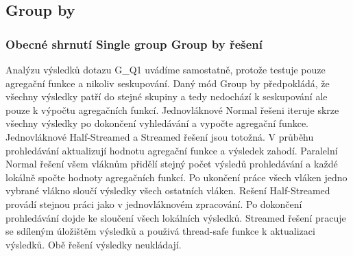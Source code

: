 \subsection{Group by}

\subsubsection{Obecné shrnutí Single group Group by řešení}

Analýzu výsledků dotazu G\_Q1 uvádíme samostatně, protože testuje pouze agregační funkce a nikoliv seskupování.
Daný mód Group by předpokládá, že všechny výsledky patří do stejné skupiny a tedy nedochází k seskupování ale pouze k výpočtu agregačních funkcí.
Jednovláknové Normal řešeni iteruje skrze všechny výsledky po dokončení vyhledávání a vypočte agregační funkce.
Jednovláknové Half-Streamed a Streamed řešení jsou totožná.
V průběhu prohledávání aktualizují hodnotu agregační funkce a výsledek zahodí. 
Paralelní Normal řešení všem vláknům přidělí stejný počet výsledů prohledávání a každé lokálně spočte hodnoty agregačních funkcí.
Po ukončení práce všech vláken jedno vybrané vlákno sloučí výsledky všech ostatních vláken. 
Rešení Half-Streamed provádí stejnou práci jako v jednovláknovém zpracování.
Po dokončení prohledávání dojde ke sloučení všech lokálních výsledků.
Streamed řešení pracuje se sdíleným úložištěm výsledků a použivá thread-safe funkce k aktualizaci výsledků.
Obě řešení výsledky neukládají.

